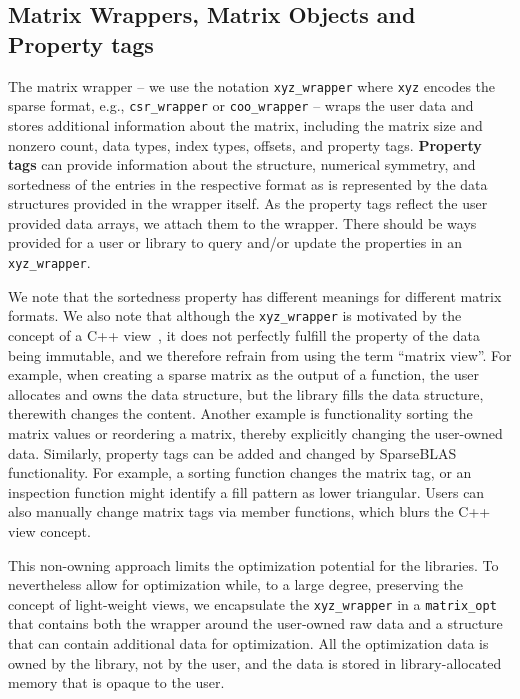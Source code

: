 \documentclass[manuscript,review]{acmart}
\begin{document}
\subsection{Matrix Wrappers, Matrix Objects and Property tags}

The matrix wrapper -- we use the notation \texttt{xyz\_wrapper} where \texttt{xyz} encodes the sparse format, e.g., \texttt{csr\_wrapper} or \texttt{coo\_wrapper} -- wraps the user data and stores additional information about the matrix, including the matrix size and nonzero count, data types, index types, offsets, and property tags. \textbf{Property tags} can provide information about the structure, numerical symmetry, and sortedness of the entries in the respective format as is represented by the data structures provided in the wrapper itself. As the property tags reflect the user provided data arrays, we attach them to the wrapper.  There should be ways provided for a user or library to query and/or update the properties in an \texttt{xyz\_wrapper}.

We note that the sortedness property has different meanings for different matrix formats. We also note that although the \texttt{xyz\_wrapper} is motivated by the concept of a C++ view~\cite{cpplinalg:p1673r13}, it does not perfectly fulfill the property of the data being immutable, and we therefore refrain from using the term ``matrix view''. For example, when creating a sparse matrix as the output of a function, the user allocates and owns the data structure, but the library fills the data structure, therewith changes the content. Another example is functionality sorting the matrix values or reordering a matrix, thereby explicitly changing the user-owned data. Similarly, property tags can be added and changed by SparseBLAS functionality. For example, a sorting function changes the matrix tag, or an inspection function might identify a fill pattern as lower triangular. Users can also manually change matrix tags via member functions, which blurs the C++ view concept.

This non-owning approach limits the optimization potential for the libraries.
To nevertheless allow for optimization while,
to a large degree,
preserving the concept of light-weight views, we encapsulate the \texttt{xyz\_wrapper} in a \texttt{matrix\_opt} that contains both the wrapper around the user-owned raw data and a structure that can contain additional data for optimization. All the optimization data is owned by the library, not by the user, and the data is stored in library-allocated memory that is opaque to the user.
\end{document}
